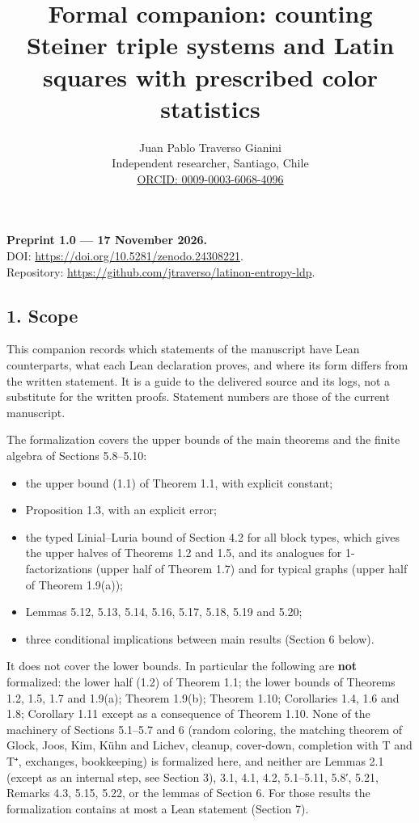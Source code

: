 \documentclass[english,11pt,a4paper]{article}
\title{Formal companion: counting Steiner triple systems and Latin squares with prescribed color statistics}
\author{Juan Pablo Traverso Gianini\\\small Independent researcher, Santiago, Chile\\\small \href{https://orcid.org/0009-0003-6068-4096}{ORCID: 0009-0003-6068-4096}}
\date{}
\providecommand{\tightlist}{\setlength{\itemsep}{0pt}\setlength{\parskip}{0pt}}
\begin{document}
\raggedbottom\maketitle
\begin{center}
\textbf{Preprint 1.0 --- 17 November 2026.}\\
DOI: \url{https://doi.org/10.5281/zenodo.24308221}.\\
Repository: \url{https://github.com/jtraverso/latinon-entropy-ldp}.
\end{center}

\subsection{1. Scope}\label{scope}

This companion records which statements of the manuscript have Lean counterparts, what each Lean declaration proves, and where its form differs from the written statement. It is a guide to the delivered source  and its logs, not a substitute for the written proofs. Statement numbers are those of the current manuscript.

The formalization covers the upper bounds of the main theorems and the finite algebra of Sections 5.8--5.10:

\begin{itemize}
\tightlist
\item
  the upper bound (1.1) of Theorem 1.1, with explicit constant;
\item
  Proposition 1.3, with an explicit error;
\item
  the typed Linial--Luria bound of Section 4.2 for all block types, which gives the upper halves of Theorems 1.2 and 1.5, and its analogues for 1-factorizations (upper half of Theorem 1.7) and for typical graphs (upper half of Theorem 1.9(a));
\item
  Lemmas 5.12, 5.13, 5.14, 5.16, 5.17, 5.18, 5.19 and 5.20;
\item
  three conditional implications between main results (Section 6 below).
\end{itemize}

It does not cover the lower bounds. In particular the following are \textbf{not} formalized: the lower half (1.2) of Theorem 1.1; the lower bounds of Theorems 1.2, 1.5, 1.7 and 1.9(a); Theorem 1.9(b); Theorem 1.10; Corollaries 1.4, 1.6 and 1.8; Corollary 1.11 except as a consequence of Theorem 1.10. None of the machinery of Sections 5.1--5.7 and 6 (random coloring, the matching theorem of Glock, Joos, Kim, Kühn and Lichev, cleanup, cover-down, completion with T and T⁺, exchanges, bookkeeping) is formalized here, and neither are Lemmas 2.1 (except as an internal step, see Section 3), 3.1, 4.1, 4.2, 5.1--5.11, 5.8′, 5.21, Remarks 4.3, 5.15, 5.22, or the lemmas of Section 6. For those results the formalization contains at most a Lean statement (Section 7).
\end{document}
